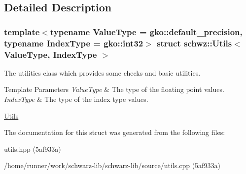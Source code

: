 \subsection{Detailed Description}
\subsubsection*{template$<$typename Value\+Type = gko\+::default\+\_\+precision, typename Index\+Type = gko\+::int32$>$\newline
struct schwz\+::\+Utils$<$ Value\+Type, Index\+Type $>$}

The utilities class which provides some checks and basic utilities. 


\begin{DoxyTemplParams}{Template Parameters}
{\em Value\+Type} & The type of the floating point values. \\
\hline
{\em Index\+Type} & The type of the index type values.\\
\hline
\end{DoxyTemplParams}
\hyperlink{group__utils}{Utils} 

The documentation for this struct was generated from the following files\+:\begin{DoxyCompactItemize}
\item 
utils.\+hpp (5af933a)\item 
/home/runner/work/schwarz-\/lib/schwarz-\/lib/source/utils.\+cpp (5af933a)\end{DoxyCompactItemize}
